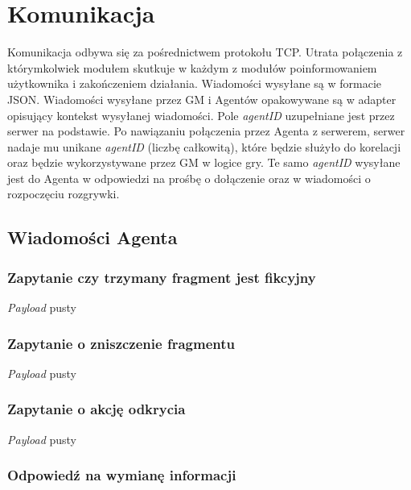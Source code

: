 \documentclass[Dokumentacja.tex]{subfiles}
\begin{document}
\section{Komunikacja}
\label{sec:komunikacja}

Komunikacja odbywa się za pośrednictwem protokołu TCP. Utrata połączenia z którymkolwiek modułem skutkuje w każdym z modułów
poinformowaniem użytkownika i zakończeniem działania. Wiadomości wysyłane są w formacie JSON.
Wiadomości wysyłane przez GM i Agentów opakowywane są w adapter opisujący kontekst wysyłanej wiadomości.
Pole \textit{agentID} uzupełniane jest przez serwer na podstawie. Po nawiązaniu połączenia przez Agenta z serwerem,
serwer nadaje mu unikane \textit{agentID} (liczbę całkowitą), które będzie służyło do korelacji oraz będzie
wykorzystywane przez GM w logice gry. Te samo \textit{agentID} wysyłane jest do Agenta w odpowiedzi na prośbę o dołączenie
oraz w wiadomości o rozpoczęciu rozgrywki.



\subsection{Wiadomości Agenta}
\subsubsection{Zapytanie czy trzymany fragment jest fikcyjny}
\textit{Payload} pusty


\subsubsection{Zapytanie o zniszczenie fragmentu}
\textit{Payload} pusty


\subsubsection{Zapytanie o akcję odkrycia}
\textit{Payload} pusty


\subsubsection{Odpowiedź na wymianę informacji}

\end{document}
